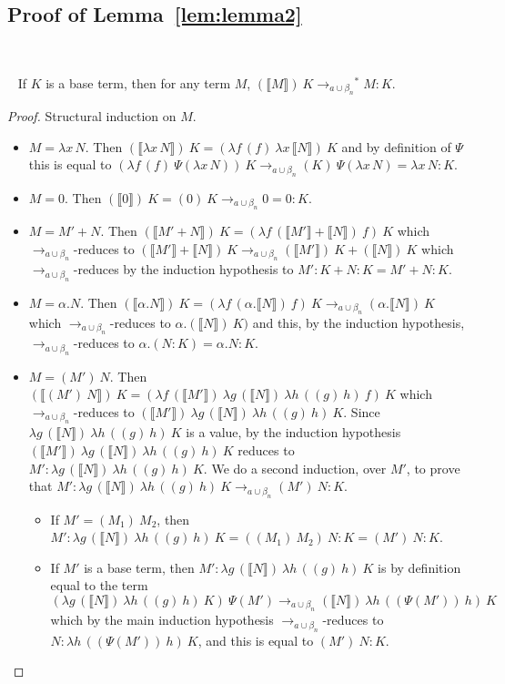 \documentclass{LMCS}
\newcommand{\recap}[2]{\medskip\noindent{\bf #1 \ref{#2}.}~}
\newcommand{\xto}[1]{\ensuremath{\rightarrow_{#1}}}
\newcommand{\tobalgred}{\xto{a\cup\beta_n}}
\newcommand{\stobalgred}{\ensuremath{\xto{a\cup\beta_n}^{\ast}}}
\newcommand{\wt}[1]{\llbracket{#1}\rrbracket}
\newcommand{\cont}[1]{\lambda f\,\left(f\right)~#1}
\newcommand{\tapp}[5]{\lambda{#1}\,({#4})~\lambda{#2}\,({#5})~\lambda{#3}\,(({#2})~{#3})~{#1}}
\newcommand{\tappfgh}{\tapp{f}{g}{h}}
\begin{document}
\subsection{Proof of Lemma~\ref{lem:lemma2}}\label{proof:lemma2}~

\recap{Lemma}{lem:lemma2}
If $K$ is a base term, then for any term $M$, $(\wt{M})~K\stobalgred M:K$.
\begin{proof}
  Structural induction on $M$.
  \begin{itemize}
    \item $M=\lambda x\,N$. Then $(\wt{\lambda x\,N})~K=(\cont{\lambda x\,\wt{N}})~K$ and by definition of $\Psi$ this is equal to $(\cont{\Psi(\lambda x\,N)})~K \tobalgred  (K) ~\Psi(\lambda x\,N)= \lambda x\,N : K$.
    \item $M=0$. Then $(\wt{0})~K = (0)~K \tobalgred 0 = 0:K$.
    \item $M = M'+N$. Then $(\wt{M'+N})~K = (\lambda f\, (\wt{M'}+\wt{N})~f)~K$ which $\tobalgred$-reduces to $(\wt{M'}+\wt{N})~K \tobalgred  (\wt{M'})~K+(\wt{N})~K $  which $\tobalgred$-reduces by the induction hypothesis to $M':K+N:K = M'+N:K$.
    \item $M = \alpha.N$. Then $(\wt{\alpha.N})~K = (\lambda f\, (\alpha. \wt{N})~f)~K \tobalgred (\alpha. \wt{N})~K$ which $\tobalgred$-reduces to $\alpha.(\wt{N})~K)$ and this, by the induction hypothesis, $\tobalgred$-reduces to $ \alpha.(N:K) = \alpha.N : K$. 
    \item $M=(M')~N$. Then $(\wt{(M')~N})~K=(\tappfgh{\wt{M'}}{\wt N})~K$ which $\tobalgred$-reduces to $(\wt{M'})~\lambda g\,(\wt{N})~\lambda h\,((g)~h)~K$. 
      Since $\lambda g\,(\wt{N})~\lambda h\,((g)~h)~K$ is a value, by the induction hypothesis 
      $(\wt{M'})~\lambda g\,(\wt{N})~\lambda h\,((g)~h)~K$
      reduces to $M':\lambda g\,(\wt{N})~\lambda h\,((g)~h)~K$.
      We do a second induction, over $M'$, to prove that $M':\lambda g\,(\wt{N})~\lambda h\,((g)~h)~K\tobalgred (M')~N:K$.
      \begin{itemize} 
	\item If $M'=(M_1)~M_2$, then $M':\lambda g\,(\wt{N})~\lambda h\,((g)~h)~K=((M_1)~M_2)~N:K=(M')~N:K$.
	\item If $M'$ is a base term, then $M':\lambda g\,(\wt{N})~\lambda h\,((g)~h)~K
	  $ is by definition equal to the term $
	  (\lambda g\,(\wt{N})~\lambda h\,((g)~h)~K)~\Psi(M')\tobalgred(\wt{N})~\lambda h\,((\Psi(M'))~h)~K$  which by the main induction hypothesis $\tobalgred$-reduces to  $ N : \lambda h\,((\Psi(M'))~h)~K$, and this is equal to $(M')~N:K$.

\end{itemize}
\end{itemize}
\end{proof}
\end{document}
